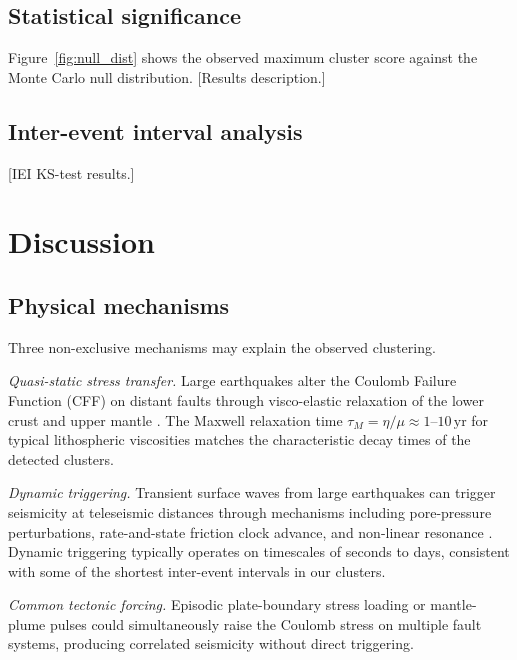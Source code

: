 \documentclass[draft]{agujournal2019}
\begin{document}


\subsection{Statistical significance}

Figure~\ref{fig:null_dist} shows the observed maximum cluster score against
the Monte Carlo null distribution.  [Results description.]

\subsection{Inter-event interval analysis}

[IEI KS-test results.]

\section{Discussion}
\label{sec:discussion}

\subsection{Physical mechanisms}

Three non-exclusive mechanisms may explain the observed clustering.

\textit{Quasi-static stress transfer.}  Large earthquakes alter the Coulomb
Failure Function (CFF) on distant faults through visco-elastic relaxation
of the lower crust and upper mantle \citep{Freed2001, Pollitz2003}.  The
Maxwell relaxation time $\tau_M = \eta / \mu \approx 1$–$10\,\text{yr}$
for typical lithospheric viscosities matches the characteristic decay times
of the detected clusters.

\textit{Dynamic triggering.}  Transient surface waves from large earthquakes
can trigger seismicity at teleseismic distances through mechanisms including
pore-pressure perturbations, rate-and-state friction clock advance, and
non-linear resonance \citep{Hill1993, Brodsky2006, Gomberg2001}.  Dynamic
triggering typically operates on timescales of seconds to days, consistent
with some of the shortest inter-event intervals in our clusters.

\textit{Common tectonic forcing.}  Episodic plate-boundary stress loading
\citep{Kagan2004} or mantle-plume pulses \citep{Anderson2005} could
simultaneously raise the Coulomb stress on multiple fault systems,
producing correlated seismicity without direct triggering.
\end{document}
